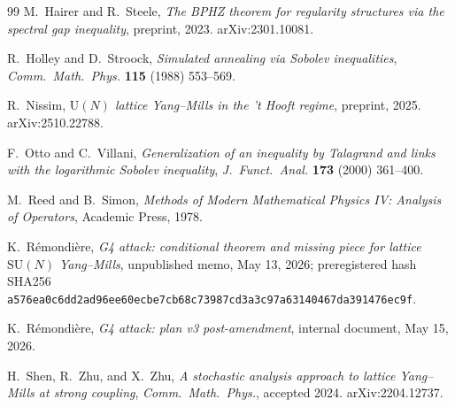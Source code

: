 \documentclass[11pt,a4paper]{amsart}
\theoremstyle{definition}
\theoremstyle{remark}
\begin{document}
\begin{thebibliography}{99}
M.~Hairer and R.~Steele,
\textit{The BPHZ theorem for regularity structures via the spectral gap inequality},
preprint, 2023. arXiv:2301.10081.

R.~Holley and D.~Stroock,
\textit{Simulated annealing via Sobolev inequalities},
\textit{Comm.\ Math.\ Phys.} \textbf{115} (1988) 553--569.

R.~Nissim,
\textit{$\mathrm{U}(N)$ lattice Yang--Mills in the 't Hooft regime},
preprint, 2025. arXiv:2510.22788.

F.~Otto and C.~Villani,
\textit{Generalization of an inequality by Talagrand and links with the logarithmic Sobolev inequality},
\textit{J.\ Funct.\ Anal.} \textbf{173} (2000) 361--400.

M.~Reed and B.~Simon,
\textit{Methods of Modern Mathematical Physics IV: Analysis of Operators},
Academic Press, 1978.

K.~R\'emondi\`ere,
\textit{G4 attack: conditional theorem and missing piece for lattice $\mathrm{SU}(N)$ Yang--Mills},
unpublished memo, May 13, 2026; preregistered hash SHA256
\verb|a576ea0c6dd2ad96ee60ecbe7cb68c73987cd3a3c97a63140467da391476ec9f|.

K.~R\'emondi\`ere,
\textit{G4 attack: plan v3 post-amendment},
internal document, May 15, 2026.

H.~Shen, R.~Zhu, and X.~Zhu,
\textit{A stochastic analysis approach to lattice Yang--Mills at strong coupling},
\textit{Comm.\ Math.\ Phys.}, accepted 2024. arXiv:2204.12737.

\end{thebibliography}
\end{document}

